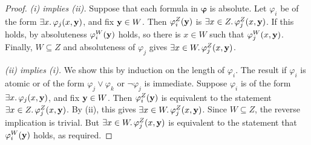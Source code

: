 \begin{proof}
    \emph{(i) implies (ii).}
    Suppose that each formula in \( \bm\varphi \) is absolute.
    Let \( \varphi_i \) be of the form \( \exists x.\, \varphi_j(x, \vb y) \), and fix \( \vb y \in W \).
    Then \( \varphi_i^Z(\vb y) \) is \( \exists x \in Z.\, \varphi_j^Z(x, \vb y) \).
    If this holds, by absoluteness \( \varphi_i^W(\vb y) \) holds, so there is \( x \in W \) such that \( \varphi_j^W(x, \vb y) \).
    Finally, \( W \subseteq Z \) and absoluteness of \( \varphi_j \) gives \( \exists x \in W.\, \varphi_j^Z(x, \vb y) \).

    \emph{(ii) implies (i).}
    We show this by induction on the length of \( \varphi_i \).
    The result if \( \varphi_i \) is atomic or of the form \( \varphi_j \vee \varphi_k \) or \( \neg\varphi_j \) is immediate.
    Suppose \( \varphi_i \) is of the form \( \exists x.\, \varphi_j(x, \vb y) \), and fix \( \vb y \in W \).
    Then \( \varphi_i^Z(\vb y) \) is equivalent to the statement \( \exists x \in Z.\, \varphi_j^Z(x, \vb y) \).
    By (ii), this gives \( \exists x \in W.\, \varphi_j^Z(x, \vb y) \).
    Since \( W \subseteq Z \), the reverse implication is trivial.
    But \( \exists x \in W.\, \varphi_j^Z(x, \vb y) \) is equivalent to the statement that \( \varphi_i^W(\vb y) \) holds, as required.
\end{proof}
